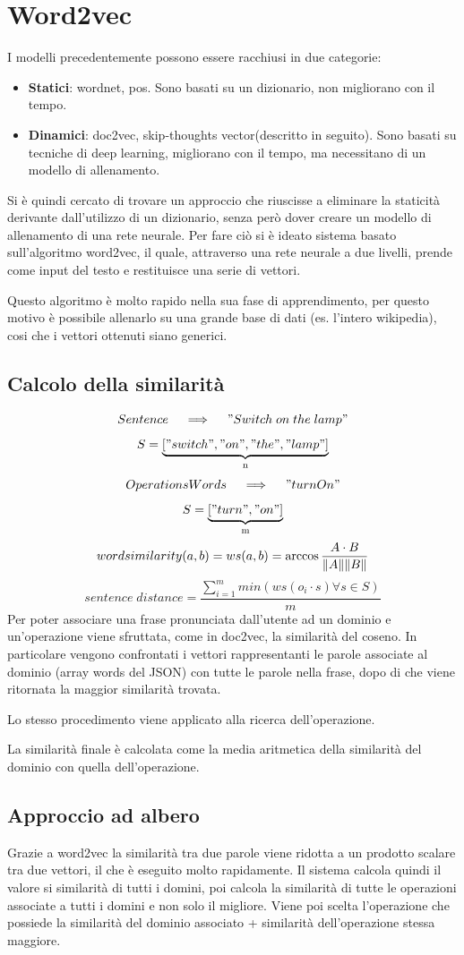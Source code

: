 \documentclass[twoside]{supsistudent}
\begin{document}
\section{Word2vec}
I modelli precedentemente possono essere racchiusi in due categorie:
\begin{itemize}
  \item \textbf{Statici}: wordnet, pos. Sono basati su un dizionario, non migliorano con il tempo.
  \item \textbf{Dinamici}: doc2vec, skip-thoughts vector(descritto in seguito). Sono basati su tecniche di deep learning, migliorano con il tempo, ma necessitano di un modello di allenamento.
\end{itemize}
Si è quindi cercato di trovare un approccio che riuscisse a eliminare la staticità derivante dall'utilizzo di un dizionario, senza però dover creare un modello di allenamento di una rete neurale.
Per fare ciò si è ideato sistema basato sull'algoritmo word2vec, il quale, attraverso una rete neurale a due livelli, prende come input del testo e restituisce una serie di vettori. 

Questo algoritmo è molto rapido nella sua fase di apprendimento, per questo motivo è possibile allenarlo su una grande base di dati (es. l'intero wikipedia), cosi che i vettori ottenuti siano generici.\cite{word2vec}
\subsection{Calcolo della similarità}
 \[
 Sentence \quad\implies\quad "Switch\;on\;the\;lamp"
 \]
 \[
 S = 
\underbrace{["switch","on","the","lamp"]}_\text{n}
\]
 \[
 OperationsWords \quad\implies\quad "turnOn"
 \]
 \[
 S = 
\underbrace{["turn","on"]}_\text{m}
\]
 \[
 word similarity (a,b)= ws(a,b) = \arccos{{A \cdot B \over \|A\| \|B\|}}  
\]
 \[
 sentence\;distance = \frac{\sum_{i=1}^{m} min(ws(o_i \cdot s)\forall s \in S)} {m}
 \]
Per poter associare una frase pronunciata dall'utente ad un dominio e un'operazione viene sfruttata, come in doc2vec, la similarità del coseno. In particolare vengono confrontati i vettori rappresentanti le parole associate al dominio (array words del JSON) con tutte le parole nella frase, dopo di che viene ritornata la maggior similarità trovata.

Lo stesso procedimento viene applicato alla ricerca dell'operazione. 

La similarità finale è calcolata come la media aritmetica della similarità del dominio con quella dell'operazione.
\subsection{Approccio ad albero}
Grazie a word2vec la similarità tra due parole viene ridotta a un prodotto scalare tra due vettori, il che è eseguito molto rapidamente. Il sistema calcola quindi il valore si similarità di tutti i domini, poi calcola la similarità di tutte le operazioni associate a tutti i domini e non solo il migliore. Viene poi scelta l'operazione che possiede la similarità del dominio associato + similarità dell'operazione stessa maggiore.
\end{document}
